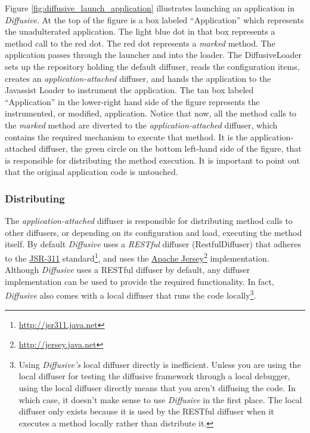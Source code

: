 \documentclass[11pt]{scrartcl}
\begin{document}
Figure \ref{fig:diffusive_launch_application} illustrates launching an application in \emph{Diffusive}. At the top of the figure is a box labeled ``Application'' which represents the unadulterated application. The light blue dot in that box represents a method call to the red dot. The red dot represents a \emph{marked} method. The application passes through the launcher and into the loader. The \textsf{DiffusiveLoader} sets up the repository holding the default diffuser, reads the configuration items, creates an \emph{application-attached} diffuser, and hands the application to the Javassist \textsf{Loader} to instrument the application. The tan box labeled ``Application'' in the lower-right hand side of the figure represents the instrumented, or modified, application. Notice that now, all the method calls to the \emph{marked} method are diverted to the \emph{application-attached} diffuser, which contains the required mechanism to execute that method. It is the application-attached diffuser, the green circle on the bottom left-hand side of the figure, that is responsible for distributing the method execution. It is important to point out that the original application code is untouched.

\subsubsection{Distributing\label{sec:distributing}}
The \emph{application-attached} diffuser is responsible for distributing method calls to other diffusers, or depending on its configuration and load, executing the method itself. By default \emph{Diffusive} uses a \emph{RESTful} diffuser (\textsf{RestfulDiffuser}) that adheres to the \href{http://jsr311.java.net}{JSR-311} standard\footnote{\url{http://jsr311.java.net}}, and uses the \href{http://jersey.java.net}{Apache Jersey}\footnote{\url{http://jersey.java.net}} implementation. Although \emph{Diffusive} uses a RESTful diffuser by default, any diffuser implementation can be used to provide the required functionality. In fact, \emph{Diffusive} also comes with a local diffuser that runs the code locally\footnote{Using \emph{Diffusive's} local diffuser directly is inefficient. Unless you are using the local diffuser for testing the diffusive framework through a local debugger, using the local diffuser directly means that you aren't diffusing the code. In which case, it doesn't make sense to use \emph{Diffusive} in the first place. The local diffuser only exists because it is used by the RESTful diffuser when it executes a method locally rather than distribute it.}.
\end{document}
